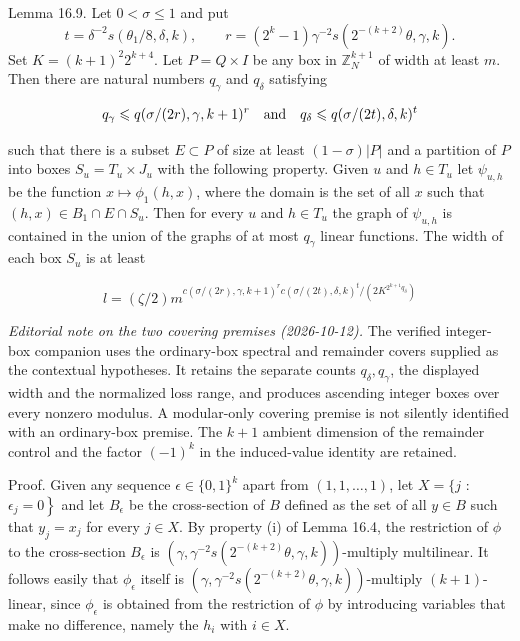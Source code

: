 \documentclass[10pt]{article}
\begin{document}
Lemma 16.9. Let $0<\sigma\leqslant1$ and put
$$
t=\delta^{-2}s(\theta_1/8,\delta,k),\qquad
r=(2^k-1)\gamma^{-2}s(2^{-(k+2)}\theta,\gamma,k).
$$
Set $K=(k+1)^2 2^{k+4}$. Let $P=Q \times I$ be any box in $\mathbb{Z}_{N}^{k+1}$ of width at least $m$. Then there are natural numbers $q_{\gamma}$ and $q_{\delta}$ satisfying

$$
q_{\gamma}\leqslant q(\sigma / (2 r), \gamma, k+1)^{r}
\quad\hbox{and}\quad
q_{\delta}\leqslant q(\sigma / (2 t),\delta,k)^{t}
$$

such that there is a subset $E \subset P$ of size at least $(1-\sigma)|P|$ and a partition of $P$ into boxes $S_{u}=T_{u} \times J_{u}$ with the following property. Given $u$ and $h \in T_{u}$ let $\psi_{u, h}$ be the function $x \mapsto \phi_{1}(h, x)$, where the domain is the set of all $x$ such that $(h, x) \in B_{1} \cap E \cap S_{u}$. Then for every $u$ and $h \in T_{u}$ the graph of $\psi_{u, h}$ is contained in the union of the graphs of at most $q_{\gamma}$ linear functions. The width of each box $S_{u}$ is at least

$$
l=(\zeta / 2) m^{c(\sigma / (2 r), \gamma, k+1)^{r} c(\sigma / (2 t), \delta, k)^{t} / \left(2 K^{2^{k+1}q_{\delta}}\right)}
$$


\emph{Editorial note on the two covering premises (2026-10-12).}
The verified integer-box companion uses the ordinary-box spectral and
remainder covers supplied as the contextual hypotheses. It retains the
separate counts $q_\delta,q_\gamma$, the displayed width and the normalized
loss range, and produces ascending integer boxes over every nonzero
modulus. A modular-only covering premise is not silently identified with
an ordinary-box premise. The $k+1$ ambient dimension of the remainder
control and the factor $(-1)^k$ in the induced-value identity are retained.

Proof. Given any sequence $\epsilon \in\{0,1\}^{k}$ apart from $(1,1, \ldots, 1)$, let $X=\{j$ : $\left.\epsilon_{j}=0\right\}$ and let $B_{\epsilon}$ be the cross-section of $B$ defined as the set of all $y \in B$ such that $y_{j}=x_{j}$ for every $j \in X$. By property (i) of Lemma 16.4, the restriction of $\phi$ to the cross-section $B_{\epsilon}$ is $\left(\gamma, \gamma^{-2} s\left(2^{-(k+2)} \theta, \gamma, k\right)\right)$-multiply multilinear. It follows easily that $\phi_{\epsilon}$ itself is $\left(\gamma, \gamma^{-2} s\left(2^{-(k+2)} \theta, \gamma, k\right)\right)$-multiply $(k+1)$-linear, since $\phi_{\epsilon}$ is obtained from the restriction of $\phi$ by introducing variables that make no difference, namely the $h_{i}$ with $i \in X$.
\end{document}

